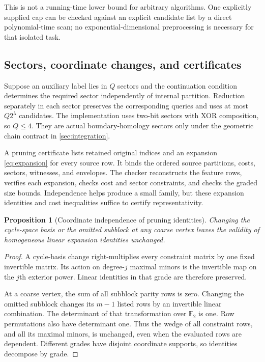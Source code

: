 \documentclass[11pt,a4paper]{article}
\newtheorem{proposition}[theorem]{Proposition}
\theoremstyle{definition}
\theoremstyle{remark}
\newcommand{\F}{\mathbb F_2}
\begin{document}
This is not a running-time lower bound for arbitrary algorithms. One explicitly supplied
cap can be checked against an explicit candidate list by a direct polynomial-time scan;
no exponential-dimensional preprocessing is necessary for that isolated task.

\subsection{Sectors, coordinate changes, and certificates}
Suppose an auxiliary label lies in $Q$ sectors and the continuation condition determines
the required sector independently of internal partition. Reduction separately in each
sector preserves the corresponding queries and uses at most $Q2^\lambda$ candidates.
The implementation uses two-bit sectors with XOR composition, so $Q\le4$. They are
actual boundary-homology sectors only under the geometric chain contract in
\cref{sec:integration}.

A pruning certificate lists retained original indices and an expansion
\eqref{eq:expansion} for every source row. It binds the ordered source partitions, costs,
sectors, witnesses, and envelopes. The checker reconstructs the feature rows, verifies
each expansion, checks cost and sector constraints, and checks the graded size bounds.
Independence helps produce a small family, but these expansion identities and cost
inequalities suffice to certify representativity.

\begin{proposition}[Coordinate independence of pruning identities]\label{prop:invariance}
Changing the cycle-space basis or the omitted subblock at any coarse vertex leaves the
validity of homogeneous linear expansion identities unchanged.
\end{proposition}
\begin{proof}
A cycle-basis change right-multiplies every constraint matrix by one fixed invertible
matrix. Its action on degree-$j$ maximal minors is the invertible map on the $j$th
exterior power. Linear identities in that grade are therefore preserved.

At a coarse vertex, the sum of all subblock parity rows is zero. Changing the omitted
subblock changes its $m-1$ listed rows by an invertible linear combination. The determinant
of that transformation over $\F$ is one. Row permutations also have determinant one.
Thus the wedge of all constraint rows, and all its maximal minors, is unchanged, even
when the evaluated rows are dependent. Different grades have disjoint coordinate supports,
so identities decompose by grade.
\end{proof}
\end{document}
